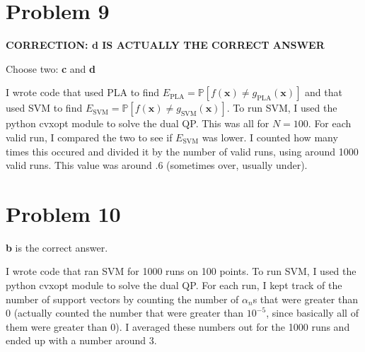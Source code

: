 \documentclass{article}
\begin{document}
\section*{Problem 9}
\textbf{CORRECTION: d IS ACTUALLY THE CORRECT ANSWER}

\noindent Choose two: \textbf{c} and \textbf{d}

\noindent I wrote code that used PLA to find
$E_{\text{PLA}} = \mathbb{P}[f(\mathbf{x}) \neq g_{\text{PLA}}(\mathbf{x})]$
and that used SVM to find
$E_{\text{SVM}} = \mathbb{P}[f(\mathbf{x}) \neq g_{\text{SVM}}(\mathbf{x})]$.
To run SVM, I used the python cvxopt module to solve the dual QP.
This was all for $N = 100$.  For each valid run, I compared the two to see
if $E_{\text{SVM}}$ was lower. I counted how many times this occured and divided
it by the number of valid runs, using around 1000 valid runs. This value was
around $.6$ (sometimes over, usually under).

\section*{Problem 10}
\textbf{b} is the correct answer.

\noindent I wrote code that ran SVM for 1000 runs on 100 points.
To run SVM, I used the python cvxopt module to solve the dual QP. For each run,
I kept track of the number of support vectors by counting the number of
$\alpha_n$s that were greater than 0 (actually counted the number that were
greater than $10^{-5}$, since basically all of them were greater than 0). I
averaged these numbers out for the 1000 runs and ended up with a number around 3.
\end{document}
